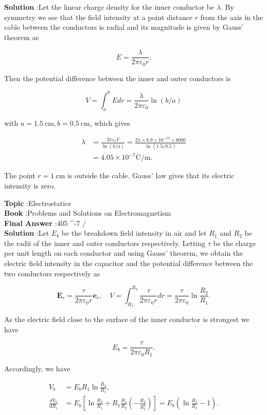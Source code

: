 \documentclass[10pt]{article}
\begin{document}
\textbf{Solution} :Let the linear charge density for the inner conductor be $\lambda$. By symmetry we see that the field intensity at a point distance $r$ from the axis in the cable between the conductors is radial and its magnitude is given by Gauss' theorem as

$$
E=\frac{\lambda}{2 \pi \varepsilon_{0} r} .
$$

Then the potential difference between the inner and outer conductors is

$$
V=\int_{a}^{b} E d r=\frac{\lambda}{2 \pi \varepsilon_{0}} \ln (b / a)
$$

with $a=1.5 \mathrm{~cm}, b=0.5 \mathrm{~cm}$, which gives

$$
\begin{aligned}
\lambda &=\frac{2 \pi \varepsilon_{0} V}{\ln (b / a)}=\frac{2 \pi \times 8.9 \times 10^{-12} \times 8000}{\ln (1.5 / 0.5)} \\
&=4.05 \times 10^{-7} \mathrm{C} / \mathrm{m} .
\end{aligned}
$$

 The point $r=1 \mathrm{~cm}$ is outside the cable. Gauss' law gives that its electric intensity is zero.

\textbf{Topic} :Electrostatics\\
\textbf{Book} :Problems and Solutions on Electromagnetism\\
\textbf{Final Answer} :405 ^{-7}  / \\


\textbf{Solution} :Let $E_{b}$ be the breakdown field intensity in air and let $R_{1}$ and $R_{2}$ be the radii of the inner and outer conductors respectively. Letting $\tau$ be the charge per unit length on each conductor and using Gauss' theorem, we obtain the electric field intensity in the capacitor and the potential difference between the two conductors respectively as

$$
\mathbf{E}_{r}=\frac{\tau}{2 \pi \varepsilon_{0} r} \mathbf{e}_{r}, \quad V=\int_{R_{1}}^{R_{2}} \frac{\tau}{2 \pi \varepsilon_{0} r} d r=\frac{\tau}{2 \pi \varepsilon_{0}} \ln \frac{R_{2}}{R_{1}} .
$$

As the electric field close to the surface of the inner conductor is strongest we have

$$
E_{b}=\frac{\tau}{2 \pi \varepsilon_{0} R_{1}} .
$$

Accordingly, we have

$$
\begin{aligned}
V_{b} &=E_{b} R_{1} \ln \frac{R_{2}}{R_{1}}, \\
\frac{d V_{b}}{d R_{1}} &=E_{b}\left[\ln \frac{R_{2}}{R_{1}}+R_{1} \frac{R_{1}}{R_{2}}\left(-\frac{R_{2}}{R_{1}^{2}}\right)\right]=E_{b}\left(\ln \frac{R_{2}}{R_{1}}-1\right) .
\end{aligned}
$$
\end{document}
